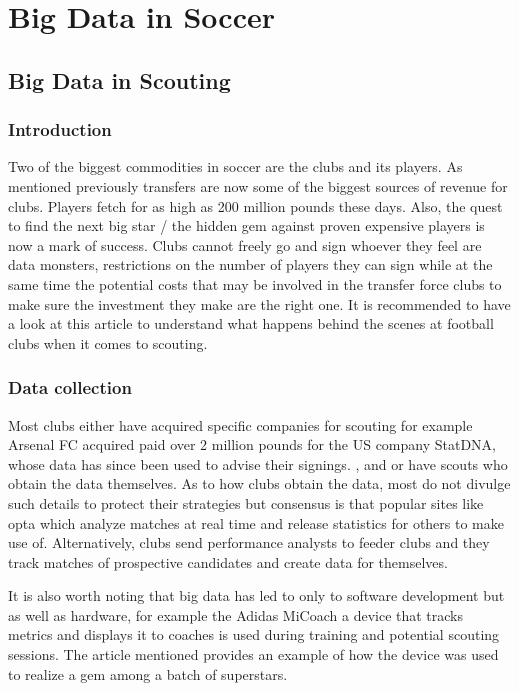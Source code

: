 \documentclass[sigconf]{acmart}
\begin{document}
\section{Big Data in Soccer}
\subsection{Big Data in Scouting}

\subsubsection{Introduction}

Two of the biggest commodities in soccer are the clubs and its players. As mentioned previously transfers are now some of the biggest sources of revenue for clubs. Players fetch for as high as 200 million pounds these days\cite{wikipedia}. Also, the quest to find the next big star / the hidden gem against proven expensive players is now a mark of success. Clubs cannot freely go and sign whoever they feel are data monsters, restrictions on the number of players they can sign while at the same time the potential costs that may be involved in the transfer force clubs to make sure the investment they make are the right one. It is recommended to have a look at this article to understand what happens behind the scenes at football clubs when it comes to scouting\cite{2012}.

\subsubsection{Data collection}

Most clubs either have acquired specific companies for scouting for example Arsenal FC acquired paid over 2 million pounds for the US company StatDNA, whose data has since been used to advise their signings. \cite{Outsideoftheboot2000}, and or have scouts who obtain the data themselves. As to how clubs obtain the data, most do not divulge such details to protect their strategies but consensus is that popular sites like opta which analyze matches at real time and release statistics for others to make use of\cite{Optasports2000}. Alternatively, clubs send performance analysts to feeder clubs and they track matches of prospective candidates and create data for themselves.

It is also worth noting that big data has led to only to software development but as well as hardware, for example the Adidas MiCoach a device that tracks metrics and displays it to coaches is used during training and potential scouting sessions. The article mentioned provides an example of how the device was used to realize a gem among a batch of superstars.\cite{2000}
\end{document}
